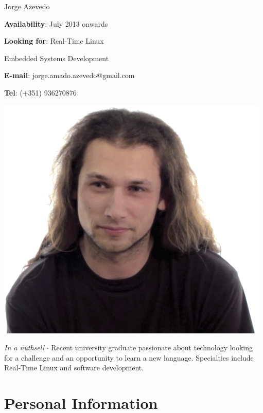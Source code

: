 



\topSection
{
	{\Huge Jorge Azevedo}

	\vspace{1.5mm}


	\vspace*{10mm}

	\textbf{Availability}: July 2013 onwards

	\textbf{Looking for}: Real-Time Linux

	\hspace{66pt}Embedded Systems Development

	\textbf{E-mail}: jorge.amado.azevedo@gmail.com

	\textbf{Tel}: \small{(+351) 936270876}
} {
	\includegraphics[width=\textwidth]{img/foto}
}

\emph{In a nuthsell} $\cdot$  Recent university graduate passionate about
technology looking for a challenge and an opportunity to learn
a new language.  Specialties include Real-Time Linux and software development.

\section*{Personal Information}


